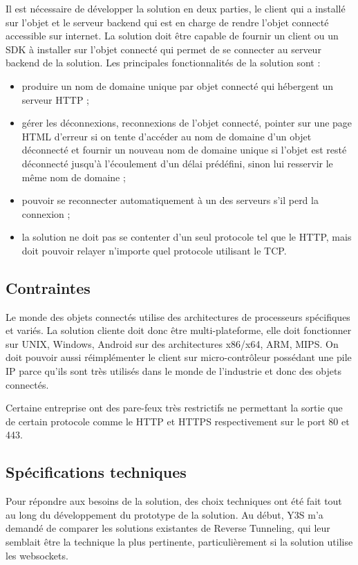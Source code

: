Il est nécessaire de développer la solution en deux parties, le client
qui a installé sur l'objet et le serveur backend qui est en charge de
rendre l'objet connecté accessible sur internet. La solution doit être
capable de fournir un client ou un SDK à installer sur l'objet
connecté qui permet de se connecter au serveur backend de la
solution. Les principales fonctionnalités de la solution sont :
\begin{itemize}
\item produire un nom de domaine unique par objet connecté qui
  hébergent un serveur HTTP ;
\item gérer les déconnexions, reconnexions de l'objet connecté,
  pointer sur une page HTML d'erreur si on tente d'accéder au nom de
  domaine d'un objet déconnecté et fournir un nouveau nom de domaine
  unique si l'objet est resté déconnecté jusqu'à l'écoulement d'un
  délai prédéfini, sinon lui resservir le même nom de domaine ;
\item pouvoir se reconnecter automatiquement à un des serveurs s'il
  perd la connexion ;
\item la solution ne doit pas se contenter d'un seul protocole tel que
  le HTTP, mais doit pouvoir relayer n'importe quel protocole
  utilisant le TCP.
\end{itemize}

\subsection{Contraintes}

Le monde des objets connectés utilise des architectures de processeurs
spécifiques et variés. La solution cliente doit donc être
multi-plateforme, elle doit fonctionner sur UNIX, Windows, Android sur
des architectures x86/x64, ARM, MIPS. On doit pouvoir aussi
réimplémenter le client sur micro-contrôleur possédant une pile IP
parce qu'ils sont très utilisés dans le monde de l'industrie et donc
des objets connectés.

Certaine entreprise ont des pare-feux très restrictifs ne permettant la sortie que de certain protocole comme le HTTP et HTTPS respectivement sur le port 80 et 443.

\subsection{Spécifications techniques}

Pour répondre aux besoins de la solution, des choix techniques ont été
fait tout au long du développement du prototype de la solution. Au
début, Y3S m'a demandé de comparer les solutions existantes de Reverse
Tunneling, qui leur semblait être la technique la plus pertinente,
particulièrement si la solution utilise les websockets.

